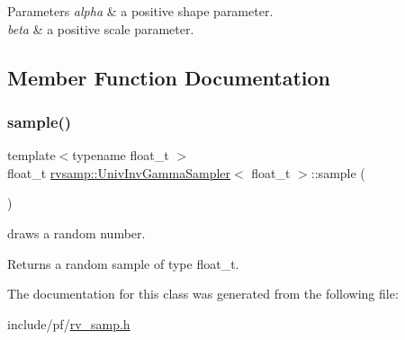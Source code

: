 \begin{DoxyParams}{Parameters}
{\em alpha} & a positive shape parameter. \\
\hline
{\em beta} & a positive scale parameter. \\
\hline
\end{DoxyParams}


\subsection{Member Function Documentation}
\mbox{\label{classrvsamp_1_1UnivInvGammaSampler_a5d477f520d0a5069c5fcda5a1952cead}} 
\subsubsection{\texorpdfstring{sample()}{sample()}}
{\footnotesize\ttfamily template$<$typename float\+\_\+t $>$ \\
float\+\_\+t \hyperlink{classrvsamp_1_1UnivInvGammaSampler}{rvsamp\+::\+Univ\+Inv\+Gamma\+Sampler}$<$ float\+\_\+t $>$\+::sample (\begin{DoxyParamCaption}{ }\end{DoxyParamCaption})}



draws a random number. 

\begin{DoxyReturn}{Returns}
a random sample of type float\+\_\+t. 
\end{DoxyReturn}


The documentation for this class was generated from the following file\+:\begin{DoxyCompactItemize}
\item 
include/pf/\hyperlink{rv__samp_8h}{rv\+\_\+samp.\+h}\end{DoxyCompactItemize}
